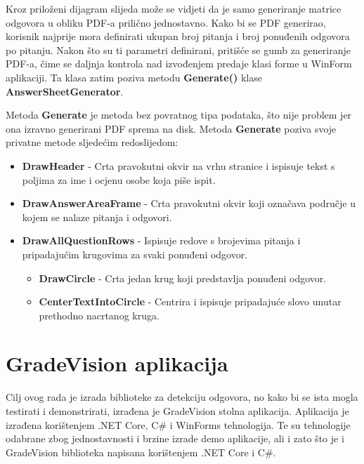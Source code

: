 \documentclass{foi}
\begin{document}
Kroz priloženi dijagram slijeda može se vidjeti da je samo generiranje matrice odgovora u obliku PDF-a prilično jednostavno. Kako bi se PDF generirao, korisnik najprije mora definirati ukupan broj pitanja i broj ponuđenih odgovora po pitanju. Nakon što su ti parametri definirani, pritišće se gumb za generiranje PDF-a, čime se daljnja kontrola nad izvođenjem predaje klasi forme u WinForm aplikaciji. Ta klasa zatim poziva metodu \textbf{Generate()} klase \textbf{AnswerSheetGenerator}. 

Metoda \textbf{Generate} je metoda bez povratnog tipa podataka, što nije problem jer ona izravno generirani PDF sprema na disk. Metoda \textbf{Generate} poziva svoje privatne metode sljedećim redoslijedom:

\begin{itemize}
\item \textbf{DrawHeader} - Crta pravokutni okvir na vrhu stranice i ispisuje tekst s poljima za ime i ocjenu osobe koja piše ispit.
\item \textbf{DrawAnswerAreaFrame} - Crta pravokutni okvir koji označava područje u kojem se nalaze pitanja i odgovori.
\item \textbf{DrawAllQuestionRows} - Ispisuje redove s brojevima pitanja i pripadajućim krugovima za svaki ponuđeni odgovor.
    \begin{itemize}
    \item \textbf{DrawCircle} - Crta jedan krug koji predstavlja ponuđeni odgovor.
    \item \textbf{CenterTextIntoCircle} - Centrira i ispisuje pripadajuće slovo unutar prethodno nacrtanog kruga.
    \end{itemize}
\end{itemize}


\section{GradeVision aplikacija}

Cilj ovog rada je izrada biblioteke za detekciju odgovora, no kako bi se ista mogla testirati i demonstrirati, izrađena je GradeVision stolna aplikacija. Aplikacija je izrađena korištenjem .NET Core, C\# i WinForms tehnologija. Te su tehnologije odabrane zbog jednostavnosti i brzine izrade demo aplikacije, ali i zato što je i GradeVision biblioteka napisana korištenjem .NET Core i C\#.
\end{document}
